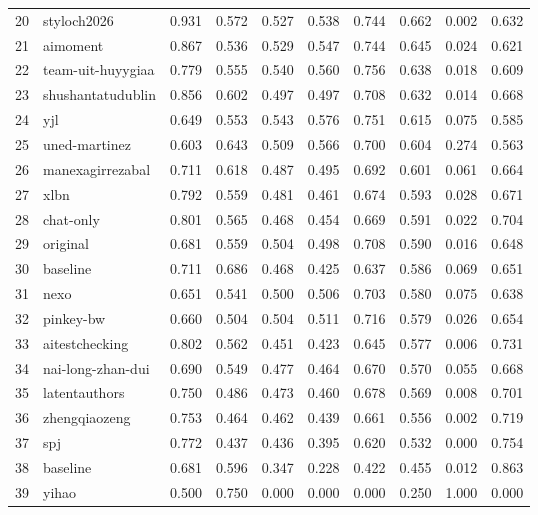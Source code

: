 \begin{tabular}{llrrrrrrrr}
20 & styloch2026 & 0.931 & 0.572 & 0.527 & 0.538 & 0.744 & 0.662 & 0.002 & 0.632 \\
21 & aimoment & 0.867 & 0.536 & 0.529 & 0.547 & 0.744 & 0.645 & 0.024 & 0.621 \\
22 & team-uit-huyygiaa & 0.779 & 0.555 & 0.540 & 0.560 & 0.756 & 0.638 & 0.018 & 0.609 \\
23 & shushantatudublin & 0.856 & 0.602 & 0.497 & 0.497 & 0.708 & 0.632 & 0.014 & 0.668 \\
24 & yjl & 0.649 & 0.553 & 0.543 & 0.576 & 0.751 & 0.615 & 0.075 & 0.585 \\
25 & uned-martinez & 0.603 & 0.643 & 0.509 & 0.566 & 0.700 & 0.604 & 0.274 & 0.563 \\
26 & manexagirrezabal & 0.711 & 0.618 & 0.487 & 0.495 & 0.692 & 0.601 & 0.061 & 0.664 \\
27 & xlbn & 0.792 & 0.559 & 0.481 & 0.461 & 0.674 & 0.593 & 0.028 & 0.671 \\
28 & chat-only & 0.801 & 0.565 & 0.468 & 0.454 & 0.669 & 0.591 & 0.022 & 0.704 \\
29 & original & 0.681 & 0.559 & 0.504 & 0.498 & 0.708 & 0.590 & 0.016 & 0.648 \\
30 & baseline & 0.711 & 0.686 & 0.468 & 0.425 & 0.637 & 0.586 & 0.069 & 0.651 \\
31 & nexo & 0.651 & 0.541 & 0.500 & 0.506 & 0.703 & 0.580 & 0.075 & 0.638 \\
32 & pinkey-bw & 0.660 & 0.504 & 0.504 & 0.511 & 0.716 & 0.579 & 0.026 & 0.654 \\
33 & aitestchecking & 0.802 & 0.562 & 0.451 & 0.423 & 0.645 & 0.577 & 0.006 & 0.731 \\
34 & nai-long-zhan-dui & 0.690 & 0.549 & 0.477 & 0.464 & 0.670 & 0.570 & 0.055 & 0.668 \\
35 & latentauthors & 0.750 & 0.486 & 0.473 & 0.460 & 0.678 & 0.569 & 0.008 & 0.701 \\
36 & zhengqiaozeng & 0.753 & 0.464 & 0.462 & 0.439 & 0.661 & 0.556 & 0.002 & 0.719 \\
37 & spj & 0.772 & 0.437 & 0.436 & 0.395 & 0.620 & 0.532 & 0.000 & 0.754 \\
38 & baseline & 0.681 & 0.596 & 0.347 & 0.228 & 0.422 & 0.455 & 0.012 & 0.863 \\
39 & yihao & 0.500 & 0.750 & 0.000 & 0.000 & 0.000 & 0.250 & 1.000 & 0.000 \\
\bottomrule
\end{tabular}
